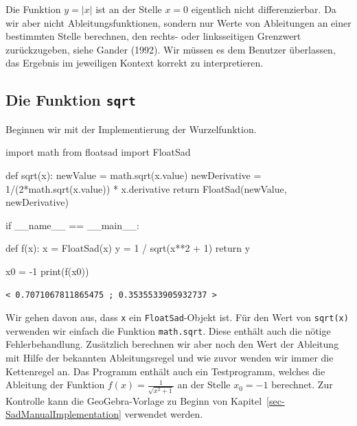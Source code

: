 \documentclass[
  letterpaper,
  DIV=11,
  oneside]{scrreprt}
\newenvironment{Shaded}{\begin{snugshade}}{\end{snugshade}}
\newcommand{\BuiltInTok}[1]{\textcolor[rgb]{0.00,0.23,0.31}{#1}}
\newcommand{\ControlFlowTok}[1]{\textcolor[rgb]{0.00,0.23,0.31}{#1}}
\newcommand{\DecValTok}[1]{\textcolor[rgb]{0.68,0.00,0.00}{#1}}
\newcommand{\ImportTok}[1]{\textcolor[rgb]{0.00,0.46,0.62}{#1}}
\newcommand{\KeywordTok}[1]{\textcolor[rgb]{0.00,0.23,0.31}{#1}}
\newcommand{\NormalTok}[1]{\textcolor[rgb]{0.00,0.23,0.31}{#1}}
\newcommand{\OperatorTok}[1]{\textcolor[rgb]{0.37,0.37,0.37}{#1}}
\newcommand{\StringTok}[1]{\textcolor[rgb]{0.13,0.47,0.30}{#1}}
\newcommand{\VariableTok}[1]{\textcolor[rgb]{0.07,0.07,0.07}{#1}}
\theoremstyle{definition}
\theoremstyle{definition}
\theoremstyle{remark}
\begin{document}
Die Funktion \(y=|x|\) ist an der Stelle \(x=0\) eigentlich nicht
differenzierbar. Da wir aber nicht Ableitungsfunktionen, sondern nur
Werte von Ableitungen an einer bestimmten Stelle berechnen, den rechts-
oder linksseitigen Grenzwert zurückzugeben, siehe Gander (1992). Wir
müssen es dem Benutzer überlassen, das Ergebnis im jeweiligen Kontext
korrekt zu interpretieren.

\hypertarget{die-funktion-sqrt}{%
\subsection{\texorpdfstring{Die Funktion
\texttt{sqrt}}{Die Funktion sqrt}}\label{die-funktion-sqrt}}

Beginnen wir mit der Implementierung der Wurzelfunktion.

\begin{Shaded}
\begin{Highlighting}[]
\ImportTok{import}\NormalTok{ math}
\ImportTok{from}\NormalTok{ floatsad }\ImportTok{import}\NormalTok{ FloatSad}

\KeywordTok{def}\NormalTok{ sqrt(x):}
\NormalTok{    newValue }\OperatorTok{=}\NormalTok{ math.sqrt(x.value)}
\NormalTok{    newDerivative }\OperatorTok{=} \DecValTok{1}\OperatorTok{/}\NormalTok{(}\DecValTok{2}\OperatorTok{*}\NormalTok{math.sqrt(x.value)) }\OperatorTok{*}\NormalTok{ x.derivative}
    \ControlFlowTok{return}\NormalTok{ FloatSad(newValue, newDerivative)}

\ControlFlowTok{if} \VariableTok{\_\_name\_\_} \OperatorTok{==} \StringTok{\textquotesingle{}\_\_main\_\_\textquotesingle{}}\NormalTok{:}

    \KeywordTok{def}\NormalTok{ f(x):}
\NormalTok{        x }\OperatorTok{=}\NormalTok{ FloatSad(x)}
\NormalTok{        y }\OperatorTok{=} \DecValTok{1} \OperatorTok{/}\NormalTok{ sqrt(x}\OperatorTok{**}\DecValTok{2} \OperatorTok{+} \DecValTok{1}\NormalTok{)}
        \ControlFlowTok{return}\NormalTok{ y}

\NormalTok{    x0 }\OperatorTok{=} \OperatorTok{{-}}\DecValTok{1}
    \BuiltInTok{print}\NormalTok{(f(x0))}
\end{Highlighting}
\end{Shaded}

\begin{verbatim}
< 0.7071067811865475 ; 0.3535533905932737 >
\end{verbatim}

Wir gehen davon aus, dass \texttt{x} ein \texttt{FloatSad}-Objekt ist.
Für den Wert von \texttt{sqrt(x)} verwenden wir einfach die Funktion
\texttt{math.sqrt}. Diese enthält auch die nötige Fehlerbehandlung.
Zusätzlich berechnen wir aber noch den Wert der Ableitung mit Hilfe der
bekannten Ableitungsregel und wie zuvor wenden wir immer die Kettenregel
an. Das Programm enthält auch ein Testprogramm, welches die Ableitung
der Funktion \(f(x) = \frac{1}{\sqrt{x^2+1}}\) an der Stelle
\(x_0 = -1\) berechnet. Zur Kontrolle kann die GeoGebra-Vorlage zu
Beginn von Kapitel~\ref{sec-SadManualImplementation} verwendet werden.
\end{document}
